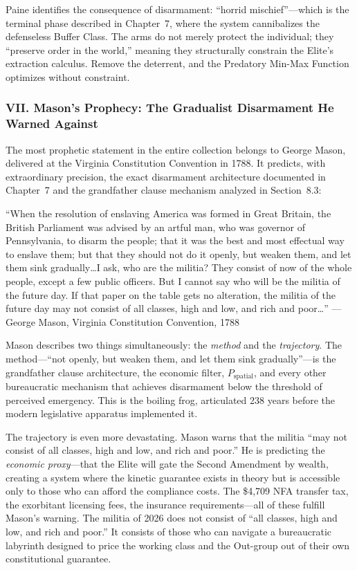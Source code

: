 \documentclass[12pt,openany]{book}
\begin{document}
Paine identifies the consequence of disarmament: ``horrid mischief''---which is the terminal phase described in Chapter~7, where the system cannibalizes the defenseless Buffer Class. The arms do not merely protect the individual; they ``preserve order in the world,'' meaning they structurally constrain the Elite's extraction calculus. Remove the deterrent, and the Predatory Min-Max Function optimizes without constraint.

\subsubsection*{VII. Mason's Prophecy: The Gradualist Disarmament He Warned Against}

The most prophetic statement in the entire collection belongs to George Mason, delivered at the Virginia Constitution Convention in 1788. It predicts, with extraordinary precision, the exact disarmament architecture documented in Chapter~7 and the grandfather clause mechanism analyzed in Section~8.3:

\begin{historicalsource}
``When the resolution of enslaving America was formed in Great Britain, the British Parliament was advised by an artful man, who was governor of Pennsylvania, to disarm the people; that it was the best and most effectual way to enslave them; but that they should not do it openly, but weaken them, and let them sink gradually\ldots I ask, who are the militia? They consist of now of the whole people, except a few public officers. But I cannot say who will be the militia of the future day. If that paper on the table gets no alteration, the militia of the future day may not consist of all classes, high and low, and rich and poor\ldots'' \hfill ---George Mason, Virginia Constitution Convention, 1788
\end{historicalsource}

Mason describes two things simultaneously: the \textit{method} and the \textit{trajectory}. The method---``not openly, but weaken them, and let them sink gradually''---is the grandfather clause architecture, the economic filter, $P_{\text{spatial}}$, and every other bureaucratic mechanism that achieves disarmament below the threshold of perceived emergency. This is the boiling frog, articulated 238 years before the modern legislative apparatus implemented it.

The trajectory is even more devastating. Mason warns that the militia ``may not consist of all classes, high and low, and rich and poor.'' He is predicting the \textit{economic proxy}---that the Elite will gate the Second Amendment by wealth, creating a system where the kinetic guarantee exists in theory but is accessible only to those who can afford the compliance costs. The \$4,709 NFA transfer tax, the exorbitant licensing fees, the insurance requirements---all of these fulfill Mason's warning. The militia of 2026 does not consist of ``all classes, high and low, and rich and poor.'' It consists of those who can navigate a bureaucratic labyrinth designed to price the working class and the Out-group out of their own constitutional guarantee.
\end{document}
